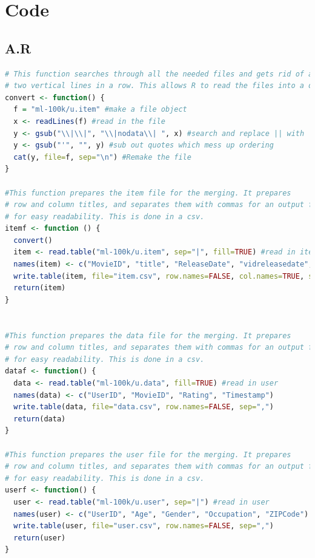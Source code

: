 \documentclass{article}
\begin{document}
\appendix
\section*{Code}
    \subsection*{A.R}
        \begin{lstlisting}[language=R]
# This function searches through all the needed files and gets rid of anything that has
# two vertical lines in a row. This allows R to read the files into a data frame properly.
convert <- function() {
  f = "ml-100k/u.item" #make a file object
  x <- readLines(f) #read in the file
  y <- gsub("\\|\\|", "\\|nodata\\| ", x) #search and replace || with |nodata|
  y <- gsub("'", "", y) #sub out quotes which mess up ordering
  cat(y, file=f, sep="\n") #Remake the file
}

#This function prepares the item file for the merging. It prepares 
# row and column titles, and separates them with commas for an output file
# for easy readability. This is done in a csv. 
itemf <- function () {
  convert()
  item <- read.table("ml-100k/u.item", sep="|", fill=TRUE) #read in item 
  names(item) <- c("MovieID", "title", "ReleaseDate", "vidreleasedate", "imdb", "Action", "Adventure", "Animation", "Children's", "Comedy", "Crime", "Documentary", "Drama", "Fantasy", "Film-Noir", "Horror", "Musical", "Mystery", "Romance", "Sci-Fi", "Thriller", "War", "Western") #assign new column titles
  write.table(item, file="item.csv", row.names=FALSE, col.names=TRUE, sep=",") #output the file in a csv.
  return(item)
}


#This function prepares the data file for the merging. It prepares 
# row and column titles, and separates them with commas for an output file
# for easy readability. This is done in a csv. 
dataf <- function() {
  data <- read.table("ml-100k/u.data", fill=TRUE) #read in user
  names(data) <- c("UserID", "MovieID", "Rating", "Timestamp")
  write.table(data, file="data.csv", row.names=FALSE, sep=",")
  return(data)
}

#This function prepares the user file for the merging. It prepares 
# row and column titles, and separates them with commas for an output file
# for easy readability. This is done in a csv. 
userf <- function() {
  user <- read.table("ml-100k/u.user", sep="|") #read in user
  names(user) <- c("UserID", "Age", "Gender", "Occupation", "ZIPCode")
  write.table(user, file="user.csv", row.names=FALSE, sep=",")
  return(user)
}


\end{lstlisting}
\end{document}

